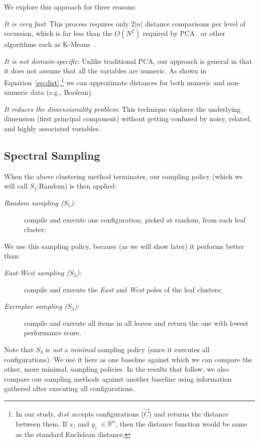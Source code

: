 \documentclass{newsig}
\begin{document}
We explore this approach for three reasons:
\begin{compactitem}
\item
{\em It is very fast}:
This process requires only $2|n|$ distance comparisons
per level of recursion, which is far less than the $O(N^2)$
required by PCA~\cite{Du2008}
or other  algorithms such as K-Means~\cite{hamerly2010making}.
\item
{\em It is not domain-specific}:
Unlike traditional PCA, our approach is general in that it does not assume that all the variables are numeric. As shown in Equation~\ref{eq:dist},\footnote{In our study, $\mathit{dist}$ accepts configurations ($\vec{C}$) and returns the distance between them. If $x_i$ and $y_i$ $\in \mathbb{R}^n$, then the distance function would be same as the standard Euclidean distance.} we can approximate distances for both numeric and non-numeric data (e.g., Boolean).

\item
{\em It reduces the dimensionality problem}:
This technique explores the underlying dimension (first principal component) without getting confused by noisy, related, and highly associated variables.
\end{compactitem}

\subsection{Spectral Sampling}\label{sect:sample}
When the above clustering method terminates, our  sampling policy (which we will call $S_1$:Random) is then applied:
\begin{description}
\item[{\em Random sampling ($S_1$):}] compile and execute one  configuration,  picked at random, from each leaf cluster;
\end{description}
We use this sampling policy, because (as we will show later) it performs better than:
\begin{description}
\item[{\em East-West sampling ($S_2$):}] compile and execute the {\em East} and {\em West} poles of the leaf clusters;
\item[{\em Exemplar sampling ($S_3$):}] compile and execute all items in all leaves and return the one
with lowest performance score.
\end{description}

Note that $S_3$ is {\em not} a {\em minimal} sampling policy (since it executes all configurations). 
We use it here as one  baseline
against which we can compare the other, more minimal, sampling policies. In the results
that follow, we also compare our 
sampling methods against another baseline using information gathered after executing
all configurations.
\end{document}
